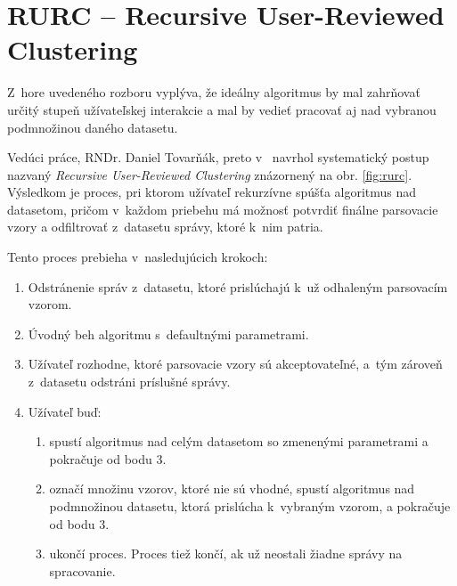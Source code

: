 \section{RURC -- Recursive User-Reviewed Clustering}
\label{sec:rurc}
Z~hore uvedeného rozboru vyplýva, že ideálny algoritmus by mal zahrňovať určitý stupeň užívateľskej interakcie a mal by vedieť pracovať aj nad vybranou podmnožinou daného datasetu.
\par Vedúci práce, RNDr. Daniel Tovarňák, preto v~\parencite{Tovarnak2017} navrhol syste\-matický postup nazvaný \emph{Recursive User-Reviewed Clustering} znázornený na obr. \ref{fig:rurc}. Výsledkom je proces, pri ktorom užívateľ rekurzívne spúšťa algoritmus nad datasetom, pričom v~každom priebehu má možnosť potvrdiť finálne parsovacie vzory a odfiltrovať z~datasetu správy, ktoré k~nim patria.
\par Tento proces prebieha v~nasledujúcich krokoch:

\begin{enumerate}
  \item Odstránenie správ z~datasetu, ktoré prislúchajú k~už odhaleným parsovacím vzorom.
  \item Úvodný beh algoritmu s~defaultnými parametrami.
  \item Užívateľ rozhodne, ktoré parsovacie vzory sú akceptovateľné, a~tým zároveň z~datasetu odstráni príslušné správy.
  \item Užívateľ buď:
  	\begin{enumerate}
   		 \item spustí algoritmus nad celým datasetom so zmenenými parametrami a pokračuje od bodu 3.
   		 \item označí množinu vzorov, ktoré nie sú vhodné, spustí algoritmus nad podmnožinou datasetu, ktorá prislúcha k~vyb\-raným vzorom, a 				pokračuje od bodu 3.
   		 \item ukončí proces. Proces tiež končí, ak už neostali žiadne správy na spracovanie.
 	 \end{enumerate}
\end{enumerate}

